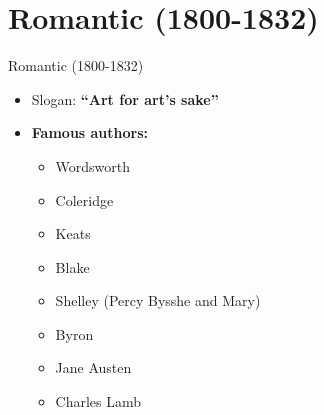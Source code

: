 \documentclass[
  12pt,
    progressbar=frametitle]{beamer}
\providecommand{\tightlist}{%
  \setlength{\itemsep}{0pt}\setlength{\parskip}{0pt}}
\begin{document}
\section{Romantic (1800-1832)}
\begin{frame}[allowframebreaks]
{Romantic (1800-1832)}
\begin{itemize}
\tightlist
\item
  Slogan: \textbf{``Art for art's sake''}
\item
  \textbf{Famous authors:}

  \begin{itemize}
  \tightlist
  \item
    Wordsworth
  \item
    Coleridge
  \item
    Keats
  \item
    Blake
  \item
    Shelley (Percy Bysshe and Mary)
  \item
    Byron
  \item
    Jane Austen
  \item
    Charles Lamb
  \end{itemize}
\end{itemize}
\end{frame}
\end{document}
